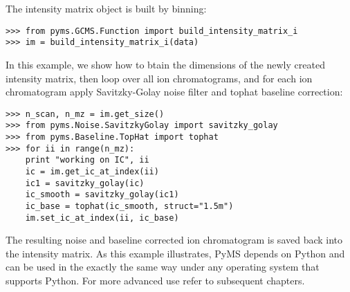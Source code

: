 The intensity matrix object is built by binning:

\begin{verbatim}
>>> from pyms.GCMS.Function import build_intensity_matrix_i
>>> im = build_intensity_matrix_i(data)
\end{verbatim}

In this example, we show how to btain the dimensions of the
newly created intensity matrix, then loop over all ion chromatograms,
and for each ion chromatogram apply Savitzky-Golay noise filter
and tophat baseline correction:

\begin{verbatim}
>>> n_scan, n_mz = im.get_size()
>>> from pyms.Noise.SavitzkyGolay import savitzky_golay
>>> from pyms.Baseline.TopHat import tophat
>>> for ii in range(n_mz):
    print "working on IC", ii
    ic = im.get_ic_at_index(ii)
    ic1 = savitzky_golay(ic)
    ic_smooth = savitzky_golay(ic1)
    ic_base = tophat(ic_smooth, struct="1.5m")
    im.set_ic_at_index(ii, ic_base)
\end{verbatim}

The resulting noise and baseline corrected ion chromatogram is saved
back into the intensity matrix. As this example illustrates, PyMS
depends on Python and can be used in the exactly the same way under
any operating system that supports Python. For more advanced use
refer to subsequent chapters.


